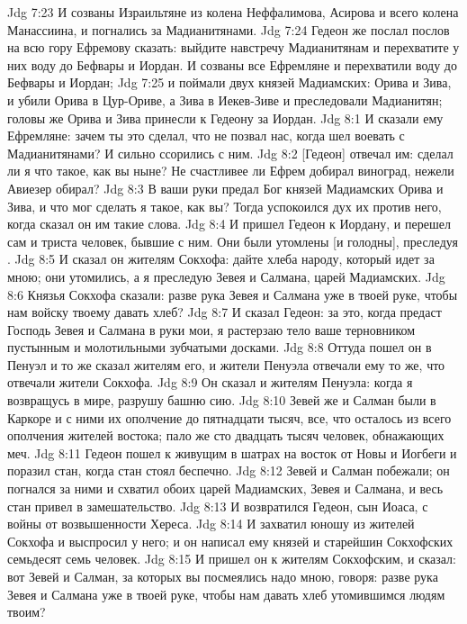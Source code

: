 \vs Jdg 7:23 И созваны Израильтяне из колена Неффалимова, Асирова и всего колена Манассиина, и погнались за Мадианитянами.
\vs Jdg 7:24 Гедеон же послал послов на всю гору Ефремову сказать: выйдите навстречу Мадианитянам и перехватите у них  воду до Бефвары и Иордан. И созваны все Ефремляне и перехватили  воду до Бефвары и Иордан;
\vs Jdg 7:25 и поймали двух князей Мадиамских: Орива и Зива, и убили Орива в Цур-Ориве, а Зива в Иекев-Зиве и преследовали Мадианитян; головы же Орива и Зива принесли к Гедеону за Иордан.
\vs Jdg 8:1 И сказали ему Ефремляне: зачем ты это сделал, что не позвал нас, когда шел воевать с Мадианитянами? И сильно ссорились с ним.
\vs Jdg 8:2 [Гедеон] отвечал им: сделал ли я что такое, как вы ныне? Не счастливее ли Ефрем добирал виноград, нежели Авиезер обирал?
\vs Jdg 8:3 В ваши руки предал Бог князей Мадиамских Орива и Зива, и что мог сделать я такое, как вы? Тогда успокоился дух их против него, когда сказал он им такие слова.
\rsbpar\vs Jdg 8:4 И пришел Гедеон к Иордану, и перешел сам и триста человек, бывшие с ним. Они были утомлены [и голодны], преследуя .
\vs Jdg 8:5 И сказал он жителям Сокхофа: дайте хлеба народу, который идет за мною; они утомились, а я преследую Зевея и Салмана, царей Мадиамских.
\vs Jdg 8:6 Князья Сокхофа сказали: разве рука Зевея и Салмана уже в твоей руке, чтобы нам войску твоему давать хлеб?
\vs Jdg 8:7 И сказал Гедеон: за это, когда предаст Господь Зевея и Салмана в руки мои, я растерзаю тело ваше терновником пустынным и молотильными зубчатыми досками.
\vs Jdg 8:8 Оттуда пошел он в Пенуэл и то же сказал жителям его, и жители Пенуэла отвечали ему то же, что отвечали жители Сокхофа.
\vs Jdg 8:9 Он сказал и жителям Пенуэла: когда я возвращусь в мире, разрушу башню сию.
\vs Jdg 8:10 Зевей же и Салман были в Каркоре и с ними их ополчение до пятнадцати тысяч, все, что осталось из всего ополчения жителей востока; пало же сто двадцать тысяч человек, обнажающих меч.
\vs Jdg 8:11 Гедеон пошел к живущим в шатрах на восток от Новы и Иогбеги и поразил стан, когда стан стоял беспечно.
\vs Jdg 8:12 Зевей и Салман побежали; он погнался за ними и схватил обоих царей Мадиамских, Зевея и Салмана, и весь стан привел в замешательство.
\rsbpar\vs Jdg 8:13 И возвратился Гедеон, сын Иоаса, с войны от возвышенности Хереса.
\vs Jdg 8:14 И захватил юношу из жителей Сокхофа и выспросил у него; и он написал ему князей и старейшин Сокхофских семьдесят семь человек.
\vs Jdg 8:15 И пришел он к жителям Сокхофским, и сказал: вот Зевей и Салман, за которых вы посмеялись надо мною, говоря: разве рука Зевея и Салмана уже в твоей руке, чтобы нам давать хлеб утомившимся людям твоим?
